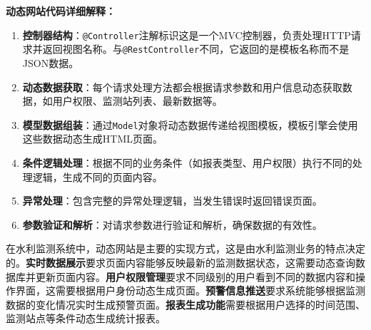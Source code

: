 \begin{Shaded}
\begin{Highlighting}[]
        \OperatorTok{[]}\OperatorTok{=}\OperatorTok{(}\OperatorTok{);}
         \OperatorTok{(} \OperatorTok{==} \OperatorTok{)} \OperatorTok{\{}
\OperatorTok{=}\OperatorTok{(}\OperatorTok{[}\OperatorTok{]);}
\OperatorTok{=}\OperatorTok{(}\OperatorTok{[}\OperatorTok{]);}
              \OperatorTok{(}\OperatorTok{,}\OperatorTok{);}
        \OperatorTok{\}}
        
        \OperatorTok{();}
    \OperatorTok{\}}
\OperatorTok{\}}
\end{Highlighting}
\end{Shaded}

\textbf{动态网站代码详细解释：}

\begin{enumerate}
\def\labelenumi{\arabic{enumi}.}
\item
  \textbf{控制器结构}：\texttt{@Controller}注解标识这是一个MVC控制器，负责处理HTTP请求并返回视图名称。与\texttt{@RestController}不同，它返回的是模板名称而不是JSON数据。
\item
  \textbf{动态数据获取}：每个请求处理方法都会根据请求参数和用户信息动态获取数据，如用户权限、监测站列表、最新数据等。
\item
  \textbf{模型数据组装}：通过\texttt{Model}对象将动态数据传递给视图模板，模板引擎会使用这些数据动态生成HTML页面。
\item
  \textbf{条件逻辑处理}：根据不同的业务条件（如报表类型、用户权限）执行不同的处理逻辑，生成不同的页面内容。
\item
  \textbf{异常处理}：包含完整的异常处理逻辑，当发生错误时返回错误页面。
\item
  \textbf{参数验证和解析}：对请求参数进行验证和解析，确保数据的有效性。
\end{enumerate}

在水利监测系统中，动态网站是主要的实现方式，这是由水利监测业务的特点决定的。\textbf{实时数据展示}要求页面内容能够反映最新的监测数据状态，这需要动态查询数据库并更新页面内容。\textbf{用户权限管理}要求不同级别的用户看到不同的数据内容和操作界面，这需要根据用户身份动态生成页面。\textbf{预警信息推送}要求系统能够根据监测数据的变化情况实时生成预警页面。\textbf{报表生成功能}需要根据用户选择的时间范围、监测站点等条件动态生成统计报表。

